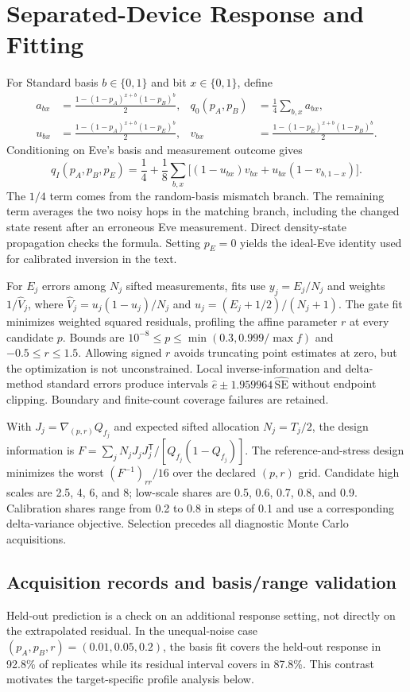 \section{Separated-Device Response and Fitting}
\label{app:diagnostic}
For Standard basis $b\in\{0,1\}$ and bit $x\in\{0,1\}$, define
\begin{align}
 a_{bx}&=\frac{1-(1-p_A)^{x+b}(1-p_B)^b}{2}, &
 q_0(p_A,p_B)&=\frac14\sum_{b,x}a_{bx},\\
 u_{bx}&=\frac{1-(1-p_A)^{x+b}(1-p_E)^b}{2}, &
 v_{bx}&=\frac{1-(1-p_E)^{x+b}(1-p_B)^b}{2}.
\end{align}
Conditioning on Eve's basis and measurement outcome gives
\begin{equation}
 q_I(p_A,p_B,p_E)=\frac14+\frac18\sum_{b,x}
 \big[(1-u_{bx})v_{bx}+u_{bx}(1-v_{b,1-x})\big].
 \label{eq:twohop}
\end{equation}
The $1/4$ term comes from the random-basis mismatch branch. The remaining term
averages the two noisy hops in the matching branch, including the changed state resent
after an erroneous Eve measurement. Direct density-state propagation checks the formula.
Setting $p_E=0$ yields the ideal-Eve identity used for calibrated inversion in the text.

For $E_j$ errors among $N_j$ sifted measurements, fits use $y_j=E_j/N_j$ and
weights $1/\widehat V_j$, where
$\widehat V_j=u_j(1-u_j)/N_j$ and $u_j=(E_j+1/2)/(N_j+1)$.
The gate fit minimizes weighted squared residuals, profiling the affine parameter $r$
at every candidate $p$. Bounds are
$10^{-8}\leq p\leq\min(0.3,0.999/\max f)$ and $-0.5\leq r\leq1.5$.
Allowing signed $r$ avoids truncating point estimates at zero, but the optimization is
not unconstrained. Local inverse-information and delta-method standard errors produce
intervals $\widehat e\pm1.959964\,\widehat{\mathrm{SE}}$ without endpoint clipping.
Boundary and finite-count coverage failures are retained.

With $J_j=\nabla_{(p,r)}Q_{f_j}$ and expected sifted allocation $N_j=T_j/2$,
the design information is
$F=\sum_j N_jJ_jJ_j^{\mathsf T}/[Q_{f_j}(1-Q_{f_j})]$.
The reference-and-stress design minimizes the worst $(F^{-1})_{rr}/16$ over the declared
$(p,r)$ grid. Candidate high scales are 2.5, 4, 6, and 8; low-scale shares are
0.5, 0.6, 0.7, 0.8, and 0.9. Calibration shares range from 0.2 to 0.8 in
steps of 0.1 and use a corresponding delta-variance objective. Selection precedes
all diagnostic Monte Carlo acquisitions.

\subsection{Acquisition records and basis/range validation}
\label{app:range}
Held-out prediction is a check on an additional response setting, not directly
on the extrapolated residual. In the unequal-noise case $(p_A,p_B,r)=(0.01,0.05,0.2)$,
the basis fit covers the held-out response in 92.8\% of replicates while its
residual interval covers in 87.8\%. This contrast motivates the target-specific
profile analysis below.

